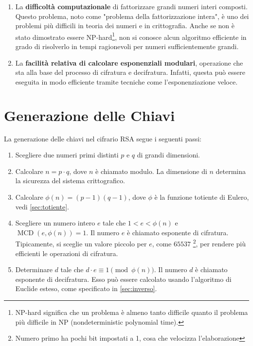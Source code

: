 \documentclass[a4paper,12pt]{report}
\begin{document}
\begin{enumerate}
    \item La \textbf{difficoltà computazionale} di fattorizzare grandi numeri interi composti. Questo problema, noto come "problema della fattorizzazione intera", è uno dei problemi più difficili in teoria dei numeri e in crittografia. Anche se non è stato dimostrato essere NP-hard\footnote[1]{NP-hard significa che un problema è almeno tanto difficile quanto il problema più difficile in NP (nondeterministic polynomial time).}, non si conosce alcun algoritmo efficiente in grado di risolverlo in tempi ragionevoli per numeri sufficientemente grandi.
    \item La \textbf{facilità relativa di calcolare esponenziali modulari}, operazione che sta alla base del processo di cifratura e decifratura. Infatti, questa può essere eseguita in modo efficiente tramite tecniche come l'esponenziazione veloce.
\end{enumerate}

\section{Generazione delle Chiavi}
La generazione delle chiavi nel cifrario RSA segue i seguenti passi:

\begin{enumerate}
    \item Scegliere due numeri primi distinti $p$ e $q$ di grandi dimensioni.
    \item Calcolare $n = p \cdot q$, dove $n$ è chiamato modulo. La dimensione di $n$ determina la sicurezza del sistema crittografico.
    \item Calcolare $\phi(n) = (p - 1)(q - 1)$, dove $\phi$ è la funzione totiente di Eulero, vedi \ref{sec:totiente}.
    \item Scegliere un numero intero $e$ tale che $1 < e < \phi(n)$ e $\operatorname{MCD}(e, \phi(n)) = 1$. Il numero $e$ è chiamato esponente di cifratura. Tipicamente, si sceglie un valore piccolo per $e$, come $65537$ \footnote{Numero primo ha pochi bit impostati a 1, cosa che velocizza l'elaborazione}, per rendere più efficienti le operazioni di cifratura.
    \item Determinare $d$ tale che $d \cdot e \equiv 1 \pmod{\phi(n)}$. Il numero $d$ è chiamato esponente di decifratura. Esso può essere calcolato usando l'algoritmo di Euclide esteso, come specificato in \ref{sec:inverso}.
\end{enumerate}
\end{document}
